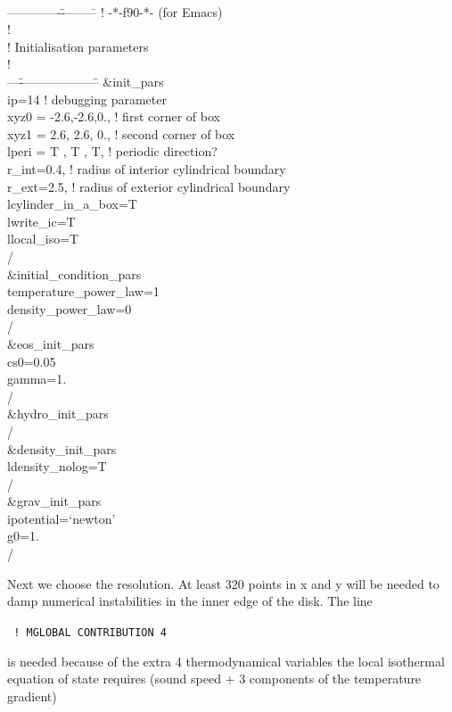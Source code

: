 \documentclass[a4paper,10pt]{article}
\begin{document}
{\tt 
\begin{tabbing}
  -------------\=---------\=\kill
! \>                          -*-f90-*-  \>   (for Emacs)\\
!\\
!  Initialisation parameters\\
!\\
---\=-------------------\=\kill
\&init\_pars\\
  \>ip=14 \>                       ! debugging parameter\\
  \>xyz0  = -2.6,-2.6,0.,\>     ! first corner of box\\
  \>xyz1  =  2.6, 2.6, 0.,\>     ! second corner of box\\
  \>lperi = T  , T  , T,    \>     ! periodic direction?\\
  \>r\_int=0.4,             \>      ! radius of interior cylindrical boundary\\
  \>r\_ext=2.5,             \>      ! radius of exterior cylindrical boundary\\
  \>lcylinder\_in\_a\_box=T\\
  \>lwrite\_ic=T\\
  \>llocal\_iso=T\\
/\\
\&initial\_condition\_pars\\
  temperature\_power\_law=1\\
  density\_power\_law=0\\
/\\
\&eos\_init\_pars\\
  \>cs0=0.05\\
  \>gamma=1.\\
/\\
\&hydro\_init\_pars\\
/\\
\&density\_init\_pars\\
  \>ldensity\_nolog=T\\
/\\
\&grav\_init\_pars\\
  \>ipotential=`newton'\\
  \>g0=1.\\
/
\end{tabbing}
}

Next we choose the resolution. At least 320 points in x and y will be needed to damp numerical instabilities in the inner edge of the disk. The line 

{\tt 
! MGLOBAL CONTRIBUTION 4 
} 

is needed because of the extra 4 thermodynamical variables the local isothermal equation of state requires (sound speed + 3 components of the temperature gradient) 
\end{document}
